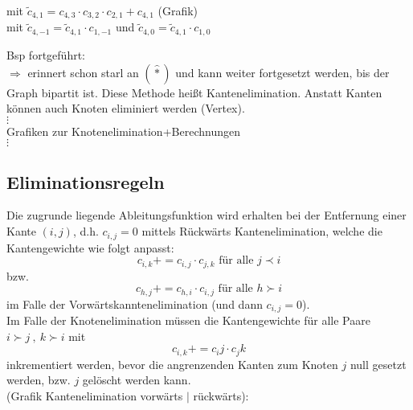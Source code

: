 \noindent
mit $\tilde{c}_{4,1}= c_{4,3}\cdot c_{3,2} \cdot c_{2,1} + c_{4,1}$
(Grafik)\\

\vspace{2cm}
mit $\tilde{c}_{4,-1} = \tilde{c}_{4,1}\cdot c_{1,-1}$ und $\tilde{c}_{4,0}=\tilde{c}_{4,1}\cdot c_{1,0}$

Bsp fortgeführt:\\
$\Rightarrow$ erinnert schon starl an $(\hat{*})$ und kann weiter fortgesetzt werden, bis der Graph bipartit ist. Diese Methode heißt Kantenelimination. Anstatt Kanten können auch Knoten eliminiert werden (Vertex).\\
$\vdots$\\
Grafiken zur Knotenelimination+Berechnungen\\
$\vdots$

\subsection{Eliminationsregeln}
Die zugrunde liegende Ableitungsfunktion wird erhalten bei der Entfernung einer Kante $(i,j)$, d.h. $c_{i,j}=0$ mittels Rückwärts Kantenelimination, welche die Kantengewichte wie folgt anpasst:
$$c_{i,k} += c_{i,j}\cdot c_{j,k} \text{ für alle } j\prec i$$
bzw.
$$c_{h,j} += c_{h,i}\cdot c_{i,j} \text{ für alle } h \succ i $$
im Falle der Vorwärtskanntenelimination (und dann $c_{i,j} =0$).\\
Im Falle der Knotenelimination müssen die Kantengewichte für alle Paare $i\succ j\ ,\ k\succ i$ mit 
$$ c_{i,k}+=c_ij\cdot c_jk$$
inkrementiert werden, bevor die angrenzenden Kanten zum Knoten $j$ null gesetzt werden, bzw. $j$ gelöscht werden kann.\\
(Grafik Kantenelimination vorwärts $|$ rückwärts):\\

\vspace{4cm}